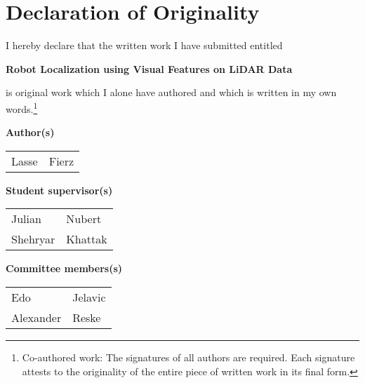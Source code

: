 
\section*{Declaration of Originality}

\vspace{0.5cm}

I hereby declare that the written work I have submitted entitled

\vspace{0.5cm}

\textbf{Robot Localization using Visual Features on LiDAR Data}

\vspace{0.5cm}

is original work which I alone have authored and which is written in my own words.\footnote{Co-authored work: The signatures of all authors are required. Each signature attests to the originality of the entire piece of written work in its final form.}

\vspace{1cm}

\textbf{Author(s)}

\vspace{0.5cm}

\begin{tabular}{ p{5cm} p{5cm} }
  Lasse & Fierz \\
\end{tabular}

\vspace{0.5cm}

\textbf{Student supervisor(s)}

\vspace{0.5cm}

\begin{tabular}{ p{5cm} p{5cm} }
  Julian & Nubert \vspace{5mm}\\
  Shehryar & Khattak\\
\end{tabular}

\vspace{0.5cm}

\textbf{Committee members(s)}

\vspace{0.5cm}

\begin{tabular}{ p{5cm} p{5cm} }
  Edo & Jelavic \vspace{0.5cm} \\
  Alexander & Reske\\
\end{tabular}

